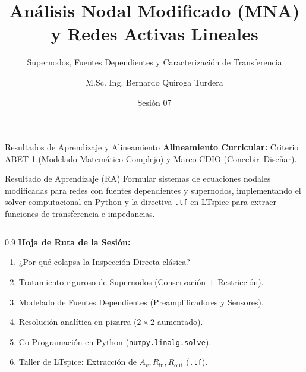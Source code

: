 \documentclass[aspectratio=169, 10pt]{beamer}
\title[Análisis Nodal Modificado (MNA)]{Análisis Nodal Modificado (MNA) y Redes Activas Lineales}
\subtitle{Supernodos, Fuentes Dependientes y Caracterización de Transferencia}
\author[M.Sc. Ing. B. Quiroga]{M.Sc. Ing. Bernardo Quiroga Turdera}
\institute[UCB Tarija]{IMT-121 Circuitos Electrónicos I | UCB Sede Tarija}
\date{Sesión 07}
\begin{document}
\begin{frame}
    \titlepage
\end{frame}

\begin{frame}{Resultados de Aprendizaje y Alineamiento}
    \textbf{Alineamiento Curricular:} Criterio ABET 1 (Modelado Matemático Complejo) y Marco CDIO (Concebir–Diseñar).
    
    \begin{block}{Resultado de Aprendizaje (RA)}
        Formular sistemas de ecuaciones nodales modificadas para redes con fuentes dependientes y supernodos, implementando el solver computacional en Python y la directiva \texttt{.tf} en LTspice para extraer funciones de transferencia e impedancias.
    \end{block}

    \vspace{0.2cm}
    \begin{columns}
        \begin{column}{0.9\textwidth}
            \textbf{Hoja de Ruta de la Sesión:}
            \begin{enumerate}
                \item ¿Por qué colapsa la Inspección Directa clásica?
                \item Tratamiento riguroso de Supernodos (Conservación + Restricción).
                \item Modelado de Fuentes Dependientes (Preamplificadores y Sensores).
                \item Resolución analítica en pizarra ($2\times 2$ aumentado).
                \item Co-Programación en Python (\texttt{numpy.linalg.solve}).
                \item Taller de LTspice: Extracción de $A_v, R_{\text{in}}, R_{\text{out}}$ (\texttt{.tf}).
            \end{enumerate}
        \end{column}
    \end{columns}
\end{frame}
\end{document}
